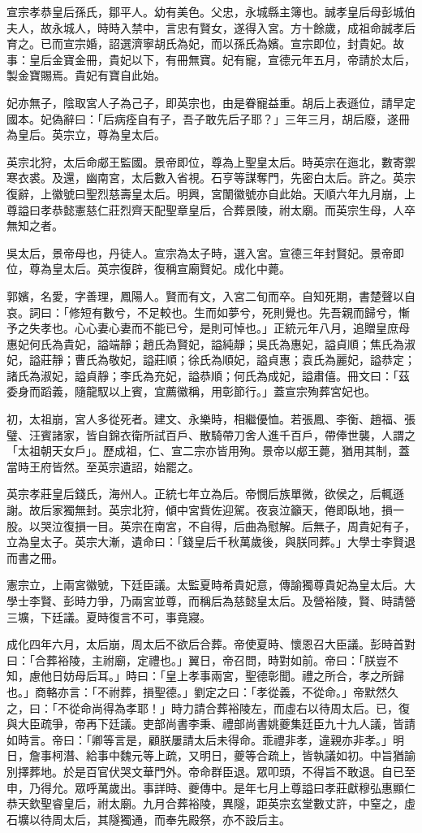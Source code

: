 宣宗孝恭皇后孫氏，鄒平人。幼有美色。父忠，永城縣主簿也。誠孝皇后母彭城伯夫人，故永城人，時時入禁中，言忠有賢女，遂得入宮。方十餘歲，成祖命誠孝后育之。已而宣宗婚，詔選濟寧胡氏為妃，而以孫氏為嬪。宣宗即位，封貴妃。故事：皇后金寶金冊，貴妃以下，有冊無寶。妃有寵，宣德元年五月，帝請於太后，製金寶賜焉。貴妃有寶自此始。

妃亦無子，陰取宮人子為己子，即英宗也，由是眷寵益重。胡后上表遜位，請早定國本。妃偽辭曰：「后病痊自有子，吾子敢先后子耶？」三年三月，胡后廢，遂冊為皇后。英宗立，尊為皇太后。

英宗北狩，太后命郕王監國。景帝即位，尊為上聖皇太后。時英宗在迤北，數寄禦寒衣裘。及還，幽南宮，太后數入省視。石亨等謀奪門，先密白太后。許之。英宗復辭，上徽號曰聖烈慈壽皇太后。明興，宮闈徽號亦自此始。天順六年九月崩，上尊謚曰孝恭懿憲慈仁莊烈齊天配聖章皇后，合葬景陵，祔太廟。而英宗生母，人卒無知之者。

吳太后，景帝母也，丹徒人。宣宗為太子時，選入宮。宣德三年封賢妃。景帝即位，尊為皇太后。英宗復辟，復稱宣廟賢妃。成化中薨。

郭嬪，名愛，字善理，鳳陽人。賢而有文，入宮二旬而卒。自知死期，書楚聲以自哀。詞曰：「修短有數兮，不足較也。生而如夢兮，死則覺也。先吾親而歸兮，慚予之失孝也。心心妻心妻而不能已兮，是則可悼也。」正統元年八月，追贈皇庶母惠妃何氏為貴妃，謚端靜；趙氏為賢妃，謚純靜；吳氏為惠妃，謚貞順；焦氏為淑妃，謚莊靜；曹氏為敬妃，謚莊順；徐氏為順妃，謚貞惠；袁氏為麗妃，謚恭定；諸氏為淑妃，謚貞靜；李氏為充妃，謚恭順；何氏為成妃，謚肅僖。冊文曰：「茲委身而蹈義，隨龍馭以上賓，宜薦徽稱，用彰節行。」蓋宣宗殉葬宮妃也。

初，太祖崩，宮人多從死者。建文、永樂時，相繼優恤。若張鳳、李衡、趙福、張璧、汪賓諸家，皆自錦衣衛所試百戶、散騎帶刀舍人進千百戶，帶俸世襲，人謂之「太祖朝天女戶」。歷成祖，仁、宣二宗亦皆用殉。景帝以郕王薨，猶用其制，蓋當時王府皆然。至英宗遺詔，始罷之。

英宗孝莊皇后錢氏，海州人。正統七年立為后。帝憫后族單微，欲侯之，后輒遜謝。故后家獨無封。英宗北狩，傾中宮貲佐迎駕。夜哀泣籲天，倦即臥地，損一股。以哭泣復損一目。英宗在南宮，不自得，后曲為慰解。后無子，周貴妃有子，立為皇太子。英宗大漸，遺命曰：「錢皇后千秋萬歲後，與朕同葬。」大學士李賢退而書之冊。

憲宗立，上兩宮徽號，下廷臣議。太監夏時希貴妃意，傳諭獨尊貴妃為皇太后。大學士李賢、彭時力爭，乃兩宮並尊，而稱后為慈懿皇太后。及營裕陵，賢、時請營三壙，下廷議。夏時復言不可，事竟寢。

成化四年六月，太后崩，周太后不欲后合葬。帝使夏時、懷恩召大臣議。彭時首對曰：「合葬裕陵，主祔廟，定禮也。」翼日，帝召問，時對如前。帝曰：「朕豈不知，慮他日妨母后耳。」時曰：「皇上孝事兩宮，聖德彰聞。禮之所合，孝之所歸也。」商輅亦言：「不祔葬，損聖德。」劉定之曰：「孝從義，不從命。」帝默然久之，曰：「不從命尚得為孝耶！」時力請合葬裕陵左，而虛右以待周太后。已，復與大臣疏爭，帝再下廷議。吏部尚書李秉、禮部尚書姚夔集廷臣九十九人議，皆請如時言。帝曰：「卿等言是，顧朕屢請太后未得命。乖禮非孝，違親亦非孝。」明日，詹事柯潛、給事中魏元等上疏，又明日，夔等合疏上，皆執議如初。中旨猶諭別擇葬地。於是百官伏哭文華門外。帝命群臣退。眾叩頭，不得旨不敢退。自已至申，乃得允。眾呼萬歲出。事詳時、夔傳中。是年七月上尊謚曰孝莊獻穆弘惠顯仁恭天欽聖睿皇后，祔太廟。九月合葬裕陵，異隧，距英宗玄堂數丈許，中窒之，虛石壙以待周太后，其隧獨通，而奉先殿祭，亦不設后主。

